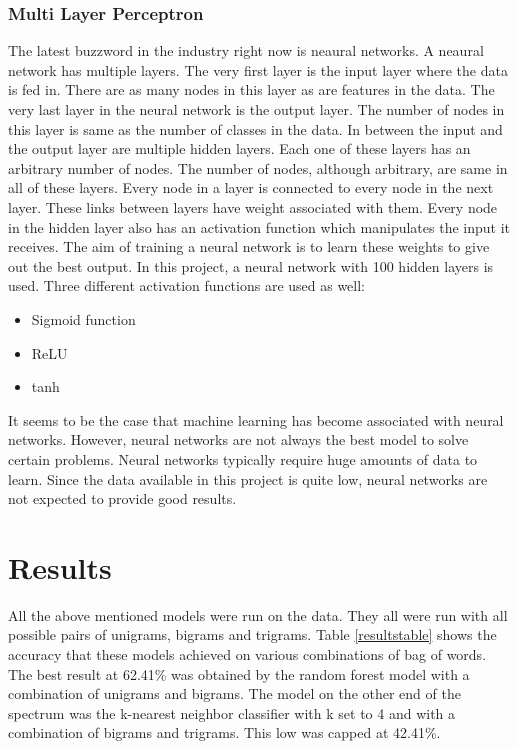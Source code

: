 \documentclass[11pt,a4paper]{article}
\begin{document}
\subsubsection{Multi Layer Perceptron}
\label{mlp}
The latest buzzword in the industry right now is neaural networks. A neaural network has multiple layers. The very first layer is the input layer where the data is fed in. There are as many nodes in this layer as are features in the data. The very last layer in the neural network is the output layer. The number of nodes in this layer is same as the number of classes in the data. In between the input and the output layer are multiple hidden layers. Each one of these layers has an arbitrary number of nodes. The number of nodes, although arbitrary, are same in all of these layers. Every node in a layer is connected to every node in the next layer. These links between layers have weight associated with them. Every node in the hidden layer also has an activation function which manipulates the input it receives. The aim of training a neural network is to learn these weights to give out the best output. In this project, a neural network with 100 hidden layers is used. Three different activation functions are used as well:
\begin{itemize}
  \item Sigmoid function
  \item ReLU
  \item tanh
\end{itemize}
It seems to be the case that machine learning has become associated with neural networks. However, neural networks are not always the best model to solve certain problems. Neural networks typically require huge amounts of data to learn. Since the data available in this project is quite low, neural networks are not expected to provide good results.

\section{Results}
\label{results}
All the above mentioned models were run on the data. They all were run with all possible pairs of unigrams, bigrams and trigrams. Table \ref{resultstable} shows the accuracy that these models achieved on various combinations of bag of words. The best result at 62.41\% was obtained by the random forest model with a combination of unigrams and bigrams. The model on the other end of the spectrum was the k-nearest neighbor classifier with k set to 4 and with a combination of bigrams and trigrams. This low was capped at 42.41\%.
\end{document}
